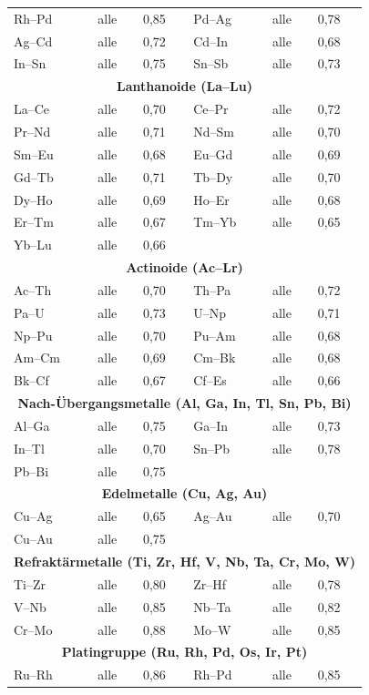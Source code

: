 \documentclass[12pt,a4paper]{article}
\begin{document}
\begin{longtable}{p{1.5cm}p{1.5cm}p{1.2cm}p{1.2cm}p{1.2cm}p{1.2cm}}
	Rh–Pd & alle & 0,85 & Pd–Ag & alle & 0,78 \\
	Ag–Cd & alle & 0,72 & Cd–In & alle & 0,68 \\
	In–Sn & alle & 0,75 & Sn–Sb & alle & 0,73 \\
	\multicolumn{6}{c}{\textbf{Lanthanoide (La–Lu)}} \\
	La–Ce & alle & 0,70 & Ce–Pr & alle & 0,72 \\
	Pr–Nd & alle & 0,71 & Nd–Sm & alle & 0,70 \\
	Sm–Eu & alle & 0,68 & Eu–Gd & alle & 0,69 \\
	Gd–Tb & alle & 0,71 & Tb–Dy & alle & 0,70 \\
	Dy–Ho & alle & 0,69 & Ho–Er & alle & 0,68 \\
	Er–Tm & alle & 0,67 & Tm–Yb & alle & 0,65 \\
	Yb–Lu & alle & 0,66 & & & \\
	\multicolumn{6}{c}{\textbf{Actinoide (Ac–Lr)}} \\
	Ac–Th & alle & 0,70 & Th–Pa & alle & 0,72 \\
	Pa–U  & alle & 0,73 & U–Np & alle & 0,71 \\
	Np–Pu & alle & 0,70 & Pu–Am & alle & 0,68 \\
	Am–Cm & alle & 0,69 & Cm–Bk & alle & 0,68 \\
	Bk–Cf & alle & 0,67 & Cf–Es & alle & 0,66 \\
	\multicolumn{6}{c}{\textbf{Nach-Übergangsmetalle (Al, Ga, In, Tl, Sn, Pb, Bi)}} \\
	Al–Ga & alle & 0,75 & Ga–In & alle & 0,73 \\
	In–Tl & alle & 0,70 & Sn–Pb & alle & 0,78 \\
	Pb–Bi & alle & 0,75 & & & \\
	\multicolumn{6}{c}{\textbf{Edelmetalle (Cu, Ag, Au)}} \\
	Cu–Ag & alle & 0,65 & Ag–Au & alle & 0,70 \\
	Cu–Au & alle & 0,75 & & & \\
	\multicolumn{6}{c}{\textbf{Refraktärmetalle (Ti, Zr, Hf, V, Nb, Ta, Cr, Mo, W)}} \\
	Ti–Zr & alle & 0,80 & Zr–Hf & alle & 0,78 \\
	V–Nb & alle & 0,85 & Nb–Ta & alle & 0,82 \\
	Cr–Mo & alle & 0,88 & Mo–W & alle & 0,85 \\
	\multicolumn{6}{c}{\textbf{Platingruppe (Ru, Rh, Pd, Os, Ir, Pt)}} \\
	Ru–Rh & alle & 0,86 & Rh–Pd & alle & 0,85 \\

\end{longtable}
\end{document}

